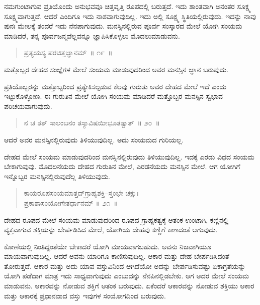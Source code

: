 ನಮಗುಂಟಾಗುವ ಪ್ರತಿಯೊಂದು ಅನುಭವವೂ ಚಿತ್ತವೃತ್ತಿ ರೂಪದಲ್ಲಿ ಬರುತ್ತದೆ. ಇದು ಶಾಂತವಾಗಿ ಅನಂತರ ಸೂಕ್ಷ್ಮ ಸೂಕ್ಷ್ಮವಾಗುತ್ತದೆ. ಆದರೆ ಎಂದಿಗೂ ಇದು ನಾಶವಾಗುವುದಿಲ್ಲ. ಇದು ಅಲ್ಲಿ ಸೂಕ್ಷ್ಮ ಸ್ಥಿತಿಯಲ್ಲಿರುವುದು. ಇದನ್ನು ನಾವು ಪುನಃ ಮೇಲಕ್ಕೆ ತಂದರೆ ಇದು ನೆನಪಾಗುವುದು. ಮನಸ್ಸಿನಲ್ಲಿರುವ ಪೂರ್ವ ಸಂಸ್ಕಾರದ ಮೇಲೆ ಯೋಗಿ ಸಂಯಮ ಮಾಡಿದರೆ, ತನ್ನ ಪೂರ್ವಜನ್ಮವೆಲ್ಲವನ್ನೂ ಜ್ಞಾಪಿಸಿಕೊಳ್ಳಲು ಮೊದಲುಮಾಡುವನು. 

\vspace{-0.2cm}

\begin{verse}
ಪ್ರತ್ಯಯಸ್ಯ ಪರಚಿತ್ತಜ್ಞಾನಮ್​~॥ ೧೯~॥
\end{verse}

\vspace{-0.2cm}

ಮತ್ತೊಬ್ಬರ ದೇಹದ ಸಂಜ್ಞೆಗಳ ಮೇಲೆ ಸಂಯಮ ಮಾಡುವುದರಿಂದ ಅವರ ಮನಸ್ಸಿನ ಜ್ಞಾನ ಬರುವುದು. 

ಪ್ರತಿಯೊಬ್ಬರನ್ನು ಮತ್ತೊಬ್ಬರಿಂದ ಪ್ರತ್ಯೇಕಿಸಲ್ಪಡುವ ಕೆಲವು ಗುರುತು ಅವರ ದೇಹದ ಮೇಲೆ ಇದೆ ಎಂದು ಇಟ್ಟುಕೊಳ್ಳೋಣ. ಈ ಗುರುತಿನ ಮೇಲೆ ಯೋಗಿ ಸಂಯಮ ಮಾಡಿದರೆ ಮತ್ತೊಬ್ಬರ ಮನಸ್ಸಿನ ಸ್ವಭಾವ ಪರಿಚಯವಾಗುವುದು. 

\vspace{-0.3cm}

\begin{verse}
ನ ಚ ತತ್​ ಸಾಲಂಬನಂ ತಸ್ಯಾವಿಷಯೀಭೂತತ್ವಾತ್​~॥ ೨೦~॥
\end{verse}

\vspace{-0.3cm}

ಆದರೆ ಅವರ ಮನಸ್ಸಿನಲ್ಲಿರುವುದು ತಿಳಿಯುವುದಿಲ್ಲ. ಅದು ಸಂಯಮದ ಗುರಿಯಲ್ಲ. 

ದೇಹದ ಮೇಲೆ ಸಂಯಮ ಮಾಡುವುದರಿಂದ ಮನಸ್ಸಿನಲ್ಲಿರುವುದು ತಿಳಿಯುವುದಿಲ್ಲ. ಇದಕ್ಕೆ ಎರಡು ವಿಧದ ಸಂಯಮ ಬೇಕಾಗುವುವು. ಮೊದಲನೆಯದು ದೇಹದ ಗುರುತಿನ ಮೇಲೆ, ಎರಡನೆಯದು ಮನಸ್ಸಿನ ಮೇಲೆ. ಆಗ ಯೋಗಿಗೆ ಇನ್ನೊಬ್ಬರ ಮನಸ್ಸಿನಲ್ಲಿರುವುದೆಲ್ಲ ತಿಳಿಯುವುದು. 

\vspace{-0.3cm}

\begin{verse}
ಕಾಯರೂಪಸಂಯಮಾತ್ತದ್​ಗ್ರಾಹ್ಯಶಕ್ತಿ–ಸ್ತಂಭೇ ಚಕ್ಷುಃ\\ಪ್ರಕಾಶಾಸಂಯೋಗೇತರ್ಧಾನಮ್​ \hfill{॥ ೨೧~॥}
\end{verse}

\vspace{-0.3cm}

ದೇಹದ ರೂಪದ ಮೇಲೆ ಸಂಯಮ ಮಾಡುವುದರಿಂದ ರೂಪದ ಗ್ರಾಹ್ಯಕತ್ವಕ್ಕೆ ಆತಂಕ ಉಂಟಾಗಿ, ಕಣ್ಣಿನಲ್ಲಿ ವ್ಯಕ್ತವಾಗುವ ಶಕ್ತಿಯನ್ನು ಬೇರ್ಪಡಿಸಿದ ಮೇಲೆ, ಯೋಗಿಯ ದೇಹವು ಕಣ್ಣಿಗೆ ಕಾಣದಂತೆ ಆಗುವುದು. 

ಕೋಣೆಯಲ್ಲಿ ನಿಂತಿದ್ದಂತೆಯೇ ಬೇಕಾದರೆ ಯೋಗಿ ಮಾಯವಾಗಬಹುದು. ಅವನು ನಿಜವಾಗಿಯೂ ಮಾಯವಾಗುವುದಿಲ್ಲ. ಆದರೆ ಅವನು ಯಾರಿಗೂ ಕಾಣಿಸುವುದಿಲ್ಲ. ಆಕಾರ ಮತ್ತು ದೇಹ ಬೇರ್ಪಡಿಸಿದಂತೆ ತೋರುತ್ತದೆ. ಆಕಾರ ಮತ್ತು ಅದು ಯಾವ ವಸ್ತುವಿನಿಂದ ಆಗಿದೆಯೋ ಅದನ್ನು ಬೇರ್ಪಡಿಸುವಷ್ಟು ಏಕಾಗ್ರತೆಯನ್ನು ಯೋಗಿ ಪಡೆದಾಗ ಮಾತ್ರ ಇದು ಸಾಧ್ಯವಾಗುವುದು ಎಂಬುದನ್ನು ನೆನಪಿನಲ್ಲಿಡಬೇಕು. ಆಗ ಅದರ ಮೇಲೆ ಸಂಯಮ ಮಾಡುವನು. ಆಕಾರವನ್ನು ನೋಡುವ ಶಕ್ತಿಗೆ ಆತಂಕ ಬರುವುದು. ಏಕೆಂದರೆ ಆಕಾರವನ್ನು ನೋಡುವ ಶಕ್ತಿಯು ಆಕಾರ ಮತ್ತು ಆಕಾರಕ್ಕೆ ಪ್ರಧಾನವಾದ ವಸ್ತು ಇವುಗಳ ಸಂಯೋಗದಿಂದ ಬರುವುದು. 

